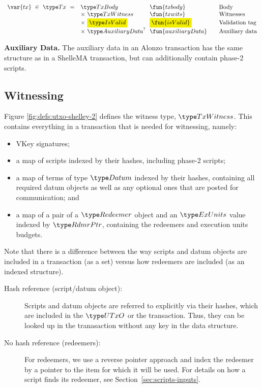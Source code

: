 \begin{figure*}[htb]
\begin{equation*}
  \end{equation*}
  \begin{equation*}
    \begin{array}{r@{~~}l@{~~}l@{\qquad}l}
      \var{tx} ~\in~ \Tx ~=~
      & \TxBody & \fun{txbody} & \text{Body}\\
      & \times ~\TxWitness & \fun{txwits} & \text{Witnesses}\\
      & \times ~\hldiff{\IsValid} & \hldiff{\fun{isValid}}&\text{Validation tag}\\
      & \times ~\AuxiliaryData^? & \fun{auxiliaryData}&\text{Auxiliary data}\\
    \end{array}
  \end{equation*}
  \caption{Definitions for transactions, cont.}
  \label{fig:defs:utxo-shelley-2}
\end{figure*}

\textbf{Auxiliary Data. } The auxiliary data in an Alonzo transaction has the same structure as
in a ShelleMA transaction, but can additionally contain phase-2 scripts.

\subsection{Witnessing}
Figure \ref{fig:defs:utxo-shelley-2} defines the witness type, $\TxWitness$.  This contains everything
in a transaction that is needed for witnessing, namely:

\begin{itemize}
  \item VKey signatures;
  \item a map of scripts indexed by their hashes, including phase-2 scripts;
  \item a map of terms of type $\Datum$ indexed by their hashes, containing all required datum objects
  as well as any optional ones that are posted for communication; and
  \item a map of a pair of a $\Redeemer$ object and an $\ExUnits$ value indexed by $\RdmrPtr$,
  containing the redeemers and execution units budgets.
\end{itemize}

Note that there is a difference between the way scripts and datum objects are included in
a transaction (as a set) versus how redeemers are included
(as an indexed structure).

\begin{description}
\item
  [Hash reference (script/datum object):]
  Scripts and datum objects are referred to explicitly via their hashes,
  which are included in the $\UTxO$ or the transaction. Thus, they can be
  looked up in the tranasaction without any key in the data structure.

  \item[No hash reference (redeemers):] For redeemers,
  we use a reverse pointer approach and
  index the redeemer by a pointer to the item for which it will be used.
  For details on how a script finds its redeemer, see Section~\ref{sec:scripts-inputs}.
\end{description}

